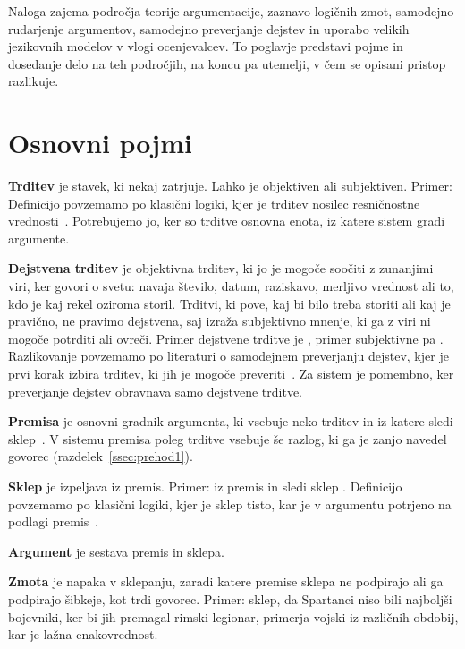 \documentclass[a4paper, 12pt]{book}
\begin{document}
Naloga zajema področja teorije argumentacije, zaznavo
logičnih zmot, samodejno rudarjenje argumentov, samodejno preverjanje dejstev in uporabo velikih jezikovnih modelov v vlogi ocenjevalcev. To poglavje predstavi pojme in dosedanje delo na teh področjih, na koncu pa utemelji, v čem se opisani pristop razlikuje.

\section{Osnovni pojmi}
\label{sec:pojmi}

\textbf{Trditev} je stavek, ki nekaj zatrjuje. Lahko je objektiven ali subjektiven. Primer:  Definicijo povzemamo po klasični logiki, kjer je trditev nosilec resničnostne vrednosti~\cite{copi2014}. Potrebujemo jo, ker so trditve osnovna enota, iz katere sistem gradi argumente. 

\textbf{Dejstvena trditev} je objektivna trditev, ki jo je mogoče soočiti z zunanjimi viri, ker govori o svetu: navaja število, datum, raziskavo, merljivo vrednost ali to, kdo je kaj rekel oziroma storil. Trditvi, ki pove, kaj bi bilo treba storiti ali kaj je pravično, ne pravimo dejstvena, saj izraža subjektivno mnenje, ki ga z viri ni mogoče potrditi ali ovreči. Primer dejstvene trditve je , primer subjektivne pa . Razlikovanje povzemamo po literaturi o samodejnem preverjanju dejstev, kjer je prvi korak izbira trditev, ki jih je mogoče preveriti~\cite{guo2022survey,hassan2017claimbuster}. Za sistem je pomembno, ker preverjanje dejstev obravnava samo dejstvene trditve.

\textbf{Premisa} je osnovni gradnik argumenta, ki vsebuje neko trditev in iz katere sledi sklep~\cite{copi2014}. V sistemu premisa poleg trditve vsebuje še razlog, ki ga je zanjo navedel govorec (razdelek~\ref{ssec:prehod1}).

\textbf{Sklep} je izpeljava iz premis. Primer: iz premis  in  sledi sklep . Definicijo povzemamo po klasični logiki, kjer je sklep tisto, kar je v argumentu potrjeno na podlagi premis~\cite{copi2014}. 

\textbf{Argument} je sestava premis in sklepa. 

\textbf{Zmota} je napaka v sklepanju, zaradi katere premise sklepa ne podpirajo ali ga podpirajo šibkeje, kot trdi govorec. Primer: sklep, da Spartanci niso bili najboljši bojevniki, ker bi jih premagal rimski legionar, primerja vojski iz različnih obdobij, kar je lažna enakovrednost. 
\end{document}
